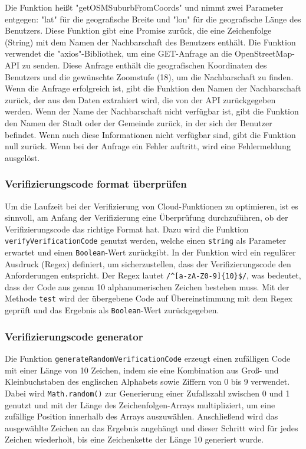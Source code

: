 Die Funktion heißt "getOSMSuburbFromCoords" und nimmt zwei Parameter entgegen: "lat" für die geografische Breite und "lon" für die geografische Länge des Benutzers. Diese Funktion gibt eine Promise zurück, die eine Zeichenfolge (String) mit dem Namen der Nachbarschaft des Benutzers enthält. Die Funktion verwendet die "axios"-Bibliothek, um eine GET-Anfrage an die OpenStreetMap-API zu senden. Diese Anfrage enthält die geografischen Koordinaten des Benutzers und die gewünschte Zoomstufe (18), um die Nachbarschaft zu finden. Wenn die Anfrage erfolgreich ist, gibt die Funktion den Namen der Nachbarschaft zurück, der aus den Daten extrahiert wird, die von der API zurückgegeben werden. Wenn der Name der Nachbarschaft nicht verfügbar ist, gibt die Funktion den Namen der Stadt oder der Gemeinde zurück, in der sich der Benutzer befindet. Wenn auch diese Informationen nicht verfügbar sind, gibt die Funktion null zurück. Wenn bei der Anfrage ein Fehler auftritt, wird eine Fehlermeldung ausgelöst.

\subsubsection{Verifizierungscode format überprüfen}
Um die Laufzeit bei der Verifizierung von Cloud-Funktionen zu optimieren, ist es sinnvoll, am Anfang der Verifizierung eine Überprüfung durchzuführen, ob der Verifizierungscode das richtige Format hat. Dazu wird die Funktion \verb|verifyVerificationCode| genutzt werden, welche einen \verb|string| als Parameter erwartet und einen \verb|Boolean|-Wert zurückgibt. In der Funktion wird ein regulärer Ausdruck (Regex) definiert, um sicherzustellen, dass der Verifizierungscode den Anforderungen entspricht. Der Regex lautet \verb|/^[a-zA-Z0-9]{10}$/|, was bedeutet, dass der Code aus genau 10 alphanumerischen Zeichen bestehen muss. Mit der Methode \verb|test| wird der übergebene Code auf Übereinstimmung mit dem Regex geprüft und das Ergebnis als \verb|Boolean|-Wert zurückgegeben.


\subsubsection{Verifizierungscode generator}

Die Funktion \texttt{generateRandomVerificationCode} erzeugt einen zufälligen Code mit einer Länge von 10 Zeichen, indem sie eine Kombination aus Groß- und Kleinbuchstaben des englischen Alphabets sowie Ziffern von 0 bis 9 verwendet. Dabei wird \texttt{Math.random()} zur Generierung einer Zufallszahl zwischen 0 und 1 genutzt und mit der Länge des Zeichenfolgen-Arrays multipliziert, um eine zufällige Position innerhalb des Arrays auszuwählen. Anschließend wird das ausgewählte Zeichen an das Ergebnis angehängt und dieser Schritt wird für jedes Zeichen wiederholt, bis eine Zeichenkette der Länge 10 generiert wurde.

